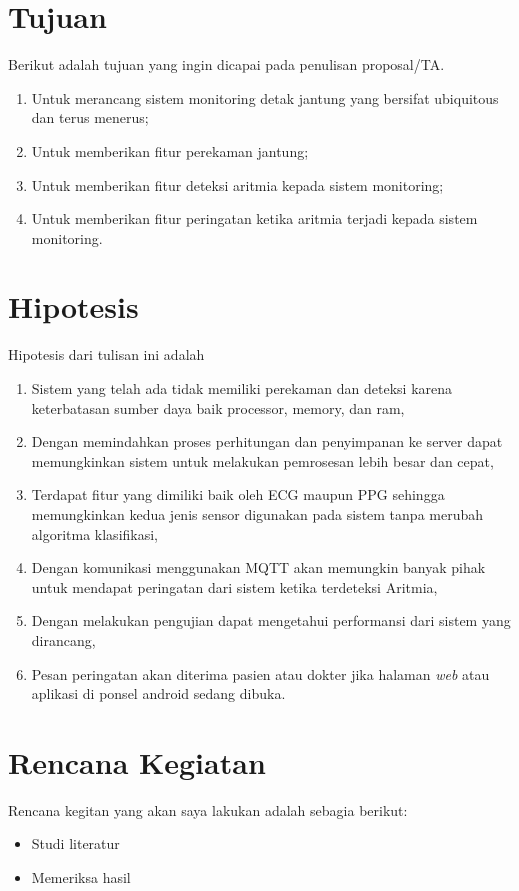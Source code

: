 \section{Tujuan}
Berikut adalah tujuan yang ingin dicapai pada penulisan proposal/TA.
\begin{enumerate}
    \item Untuk merancang sistem monitoring detak jantung yang bersifat ubiquitous dan terus menerus;
    \item Untuk memberikan fitur perekaman jantung;
    \item Untuk memberikan fitur deteksi aritmia kepada sistem monitoring;
    \item Untuk memberikan fitur peringatan ketika aritmia terjadi kepada sistem monitoring.
\end{enumerate}
\section{Hipotesis}
Hipotesis dari tulisan ini adalah
\begin{enumerate}
    \item Sistem yang telah ada tidak memiliki perekaman dan deteksi karena keterbatasan sumber daya baik processor, memory, dan ram,
    \item Dengan memindahkan proses perhitungan dan penyimpanan ke server dapat memungkinkan sistem untuk melakukan pemrosesan lebih besar dan cepat,
    \item Terdapat fitur yang dimiliki baik oleh ECG maupun PPG sehingga memungkinkan kedua jenis sensor digunakan pada sistem tanpa merubah algoritma klasifikasi,
    \item Dengan komunikasi menggunakan MQTT akan memungkin banyak pihak untuk mendapat peringatan dari sistem ketika terdeteksi Aritmia,
	\item Dengan melakukan pengujian dapat mengetahui performansi dari sistem yang dirancang,
	\item Pesan peringatan akan diterima pasien atau dokter jika halaman \textit{web} atau aplikasi di ponsel android sedang dibuka.
\end{enumerate}
\iflogTA
\else
\section{Rencana Kegiatan}
Rencana kegitan yang akan saya lakukan adalah sebagia berikut:
\begin{itemize}
    \item Studi literatur
    \item Memeriksa hasil
\end{itemize}
